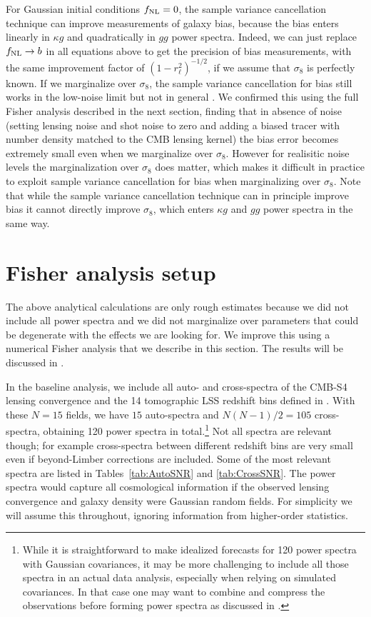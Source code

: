 \documentclass[prd,superscriptaddress,floatfix,notitlepage,nofootinbib,reprint]{revtex4-1} %
\begin{document}
For Gaussian initial conditions ${f_\mathrm{NL}}=0$, the sample variance cancellation technique can improve measurements of galaxy bias, because the bias enters linearly in $\kappa g$ and quadratically in $gg$ power spectra.
Indeed, we can just replace ${f_\mathrm{NL}}\rightarrow b$ in all equations above to get the precision of bias measurements, with the same improvement factor of $(1-r_\ell^2)^{-1/2}$, if we assume that $\sigma_8$ is perfectly known.
If we marginalize over $\sigma_8$, the sample variance cancellation for bias still works in the low-noise limit but not in general \cite{McDonaldSeljak0810}. 
We confirmed this using the full Fisher analysis described in the next section, finding that in absence of noise (setting lensing noise and shot noise to zero and adding a biased tracer with number density matched to the CMB lensing kernel) the bias error becomes extremely small even when we marginalize over $\sigma_8$. 
However for realisitic noise levels the marginalization over $\sigma_8$ does matter, which makes it difficult in practice to exploit sample variance cancellation for bias when marginalizing over $\sigma_8$.
Note that while the sample variance cancellation technique can in principle improve bias it cannot directly improve $\sigma_8$, which enters $\kappa g$ and $gg$ power spectra in the same way.





\section{Fisher analysis setup}
\label{se:FisherSetup}

The above analytical calculations are only rough estimates because we did not include all power spectra and we did not marginalize over parameters that could be degenerate with the effects we are looking for.  
We improve this using a numerical Fisher analysis that we describe in this section. 
The results will be discussed in .


In the baseline analysis, we include all auto- and cross-spectra of the CMB-S4 lensing convergence and the 14 tomographic LSS redshift bins defined in .
With these $N=15$ fields, we have $15$ auto-spectra and $N(N-1)/2=105$ cross-spectra, obtaining 120 power spectra in total.\footnote{While it is straightforward to make idealized forecasts for 120 power spectra with Gaussian covariances, it may be more challenging to include all those spectra in an actual data analysis, especially when relying on simulated covariances.  In that case one may want to combine and compress the observations before forming power spectra as discussed in .}
Not all spectra are relevant though; for example cross-spectra between different redshift bins are very small even if beyond-Limber corrections are included.
Some of the most relevant spectra are listed in Tables~\ref{tab:AutoSNR} and \ref{tab:CrossSNR}.   
The power spectra would capture all cosmological information if the observed lensing convergence and galaxy density were Gaussian random fields. For simplicity we will assume this throughout, ignoring information from higher-order statistics.
\end{document}
